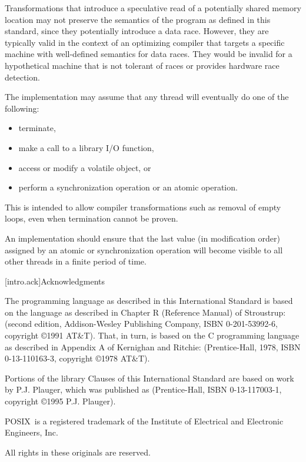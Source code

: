 \pnum
\enternote Transformations that introduce a speculative read of a potentially
shared memory location may not preserve the semantics of the \Cpp program as
defined in this standard, since they potentially introduce a data race. However,
they are typically valid in the context of an optimizing compiler that targets a
specific machine with well-defined semantics for data races. They would be
invalid for a hypothetical machine that is not tolerant of races or provides
hardware race detection. \exitnote

\pnum
The implementation may assume that any thread will eventually do one of the 
following:

\begin{itemize}
\item 
terminate,

\item
make a call to a library I/O function,

\item
access or modify a volatile object, or

\item
perform a synchronization operation or an atomic operation.
\end{itemize}

\enternote This is intended to allow compiler transformations such as removal of
empty loops, even when termination cannot be proven. \exitnote

\pnum
An implementation should ensure that the last value (in modification order)
assigned by an atomic or synchronization operation will become visible to all
other threads in a finite period of time.%
%

[intro.ack]{Acknowledgments}

\pnum
The \Cpp  programming language as described in this International
Standard is based on the language as described in Chapter R (Reference
Manual) of Stroustrup:  (second
edition, Addison-Wesley Publishing Company, ISBN 0-201-53992-6,
copyright \copyright 1991 AT\&T). That, in turn, is based on the C
programming language as described in Appendix A of Kernighan and
Ritchie:  (Prentice-Hall, 1978, ISBN
0-13-110163-3, copyright \copyright 1978 AT\&T).

\pnum
Portions of the library Clauses of this International Standard are based
on work by P.J. Plauger, which was published as  (Prentice-Hall, ISBN 0-13-117003-1, copyright
\copyright 1995 P.J. Plauger).

\pnum
POSIX\textregistered\ is a registered trademark of the Institute of Electrical and
Electronic Engineers, Inc.

\pnum
All rights in these originals are reserved.
